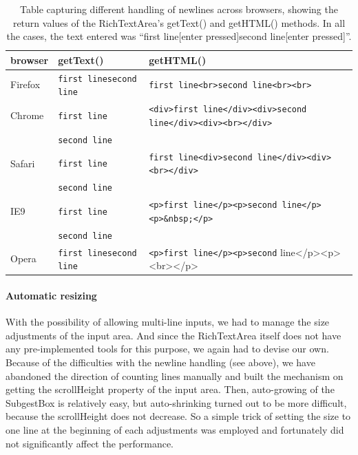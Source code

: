 \begin{table}[h]
\begin{center}
\begin{tabular}{|l|l|l|}
\hline
browser & getText()             & getHTML() \\
\hline
Firefox & \verb=first linesecond line= & \verb=first line<br>second line<br><br>= \\
\hline
Chrome  & \verb=first line=            & \verb=<div>first line</div><div>second line</div><div><br></div>= \\
        & \verb=second line=           & \\ 
\hline
Safari  & \verb=first line=            & \verb=first line<div>second line</div><div><br></div>= \\
        & \verb=second line=           & \\
\hline
IE9     & \verb=first line=            & \verb=<p>first line</p><p>second line</p><p>&nbsp;</p>= \\
        & \verb=second line=           & \\
\hline
Opera   & \verb=first linesecond line= & \verb=<p>first line</p><p>second= line</p><p><br></p> \\
\hline
\end{tabular}
\end{center}
\caption{Table capturing different handling of newlines across browsers, showing the return values of the RichTextArea's getText() and getHTML() methods. In all the cases, the text entered was ``first line[enter pressed]second line[enter pressed]''.}\label{implprocess:RichTextAreaNewlines}
\end{table}

\paragraph{Automatic resizing}
With the possibility of allowing multi-line inputs, we had to manage the size adjustments of the input area. And since the RichTextArea itself does not have any pre-implemented tools for this purpose, we again had to devise our own.
Because of the difficulties with the newline handling (see above), we have abandoned the direction of counting lines manually and built the mechanism on getting the scrollHeight property of the input area. Then, auto-growing of the SubgestBox is relatively easy, but auto-shrinking turned out to be more difficult, because the scrollHeight does not decrease. So a simple trick of setting the size to one line at the beginning of each adjustments was employed and fortunately did not significantly affect the performance.

